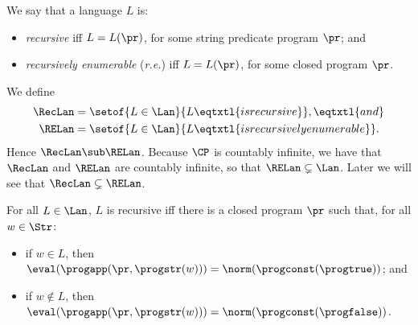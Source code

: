 We say that a language $L$ is:
\begin{itemize}
\item \emph{recursive} iff $L=L(\pr)$, for some string predicate program $\pr$;
  and

\item \emph{recursively enumerable} (\emph{r.e.}) iff $L=L(\pr)$, for
  some closed program $\pr$.
\end{itemize}

We define
\begin{align*}
\RecLan &= \setof{L\in\Lan}{L\eqtxtl{is recursive}} , \eqtxtl{and} \\
\RELan &= \setof{L\in\Lan}{L\eqtxtl{is recursively enumerable}} .
\end{align*}
Hence $\RecLan\sub\RELan$.  Because $\CP$ is countably infinite, we
have that $\RecLan$ and $\RELan$ are countably infinite, so that
$\RELan\subsetneq\Lan$.  Later we will see that
$\RecLan\subsetneq\RELan$.

\begin{proposition}
\label{RecProp}
For all $L\in\Lan$, $L$ is recursive iff there is a closed program $\pr$ such
that, for all $w\in\Str$:
\begin{itemize}
\item if $w\in L$, then $\eval(\progapp(\pr,\progstr(w)))=
\norm(\progconst(\progtrue))$; and

\item if $w\not\in L$, then
$\eval(\progapp(\pr,\progstr(w)))=\norm(\progconst(\progfalse))$.
\end{itemize}
\end{proposition}

